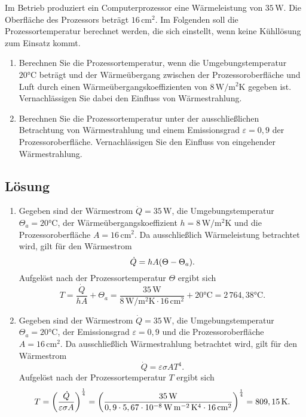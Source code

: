 \documentclass[german,12pt]{homework}
\DeclarePairedDelimiter{\enbrace}{(}{)}
\newcommand{\sis}[1]{\,\si{#1}}
\newcommand{\degC}{\si{\degreeCelsius}}
\begin{document}
    \begin{problem}
        Im Betrieb produziert ein Computerprozessor eine Wärmeleistung von
        \(35\,\si{\watt}\). Die Oberfläche des Prozessors beträgt
        \(16\,\si{\centi\meter\squared}\). Im Folgenden soll die
        Prozessortemperatur berechnet werden, die sich einstellt, wenn keine
        Kühllösung zum Einsatz kommt.
        \begin{enumerate}
            \item Berechnen Sie die Prozessortemperatur, wenn die
            Umgebungstemperatur \(20\si{\degreeCelsius}\) beträgt und der
            Wärmeübergang zwischen der Prozessoroberfläche und Luft durch einen
            Wärmeübergangskoeffizienten von
            \(8\,\si{\watt\per\meter\squared\kelvin}\) gegeben ist.
            Vernachlässigen Sie dabei den Einfluss von Wärmestrahlung.
            \item Berechnen Sie die Prozessortemperatur unter der
            ausschließlichen Betrachtung von Wärmestrahlung und einem
            Emissionsgrad \(\varepsilon = 0,9\) der Prozessoroberfläche.
            Vernachlässigen Sie den Einfluss von eingehender Wärmestrahlung.
        \end{enumerate}
    \end{problem}

    \subsection*{Lösung}
    \begin{enumerate}
        \item Gegeben sind der Wärmestrom \(\dot{Q} = 35\sis{\watt}\), die
        Umgebungstemperatur \(\Theta_a = 20\degC\), der
        Wärmeübergangskoeffizient \(h = 8\sis{\watt\per\meter\squared\kelvin}\)
        und die Prozessoroberfläche \(A = 16\sis{\centi\meter\squared}\). Da
        ausschließlich Wärmeleistung betrachtet wird, gilt für den Wärmestrom
        \[\dot{Q} = hA\enbrace*{\Theta - \Theta_a}.\]
        Aufgelöst nach der Prozessortemperatur \(\Theta\) ergibt sich
        \[T = \frac{\dot{Q}}{hA} + \Theta_a = \frac{35\sis{\watt}}{8
        \sis{\watt\per\meter\squared\kelvin} \cdot 16
        \sis{\centi\meter\squared}} + 20\degC = 2\,764,38\degC.\]
        \item Gegeben sind der Wärmestrom \(\dot{Q} = 35\sis{\watt}\), die
        Umgebungstemperatur \(\Theta_a = 20\degC\), der Emissionsgrad
        \(\varepsilon = 0,9\) und die Prozessoroberfläche \(A = 16
        \sis{\centi\meter\squared}\). Da ausschließlich Wärmestrahlung
        betrachtet wird, gilt für den Wärmestrom
        \[\dot{Q} = \varepsilon\sigma{A}T^4.\]
        Aufgelöst nach der Prozessortemperatur \(T\) ergibt sich
        \[T = \enbrace*{\frac{\dot{Q}}{\varepsilon\sigma{A}}}^\frac{1}{4}
        = \enbrace*{\frac{35\sis{\watt}}{0,9 \cdot 5,67 \cdot 10^{-8}
        \sis{\watt\per\meter\squared\kelvin\tothe{4}} \cdot 16
        \sis{\centi\meter\squared}}}^\frac{1}{4} = 809,15\sis{\kelvin}.\]
    \end{enumerate}
\end{document}
